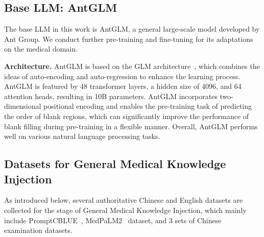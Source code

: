 \documentclass{article} %
\begin{document}
\subsection{Base LLM: AntGLM}
The base LLM in this work is AntGLM, a general large-scale model developed by Ant Group. We conduct further pre-training and fine-tuning for its adaptations on the medical domain.


\textbf{Architecture.} AntGLM is based on the GLM architecture~\citep{DBLP:conf/acl/DuQLDQY022}, which combines the ideas of auto-encoding and auto-regression to enhance the learning process. AntGLM is featured by 48 transformer layers, a hidden size of 4096, and 64 attention heads, resulting in 10B parameters. AntGLM incorporates two-dimensional positional encoding and enables the pre-training task of predicting the order of blank regions, which can significantly improve the performance of blank filling during pre-training in a flexible manner. Overall, AntGLM performs well on various natural language processing tasks.


\subsection{Datasets for General Medical Knowledge Injection}
As introduced below, several authoritative Chinese and English datasets are collected for the stage of General Medical Knowledge Injection, which mainly include PromptCBLUE~\citep{zhu2023promptcblue}, MedPaLM2~\citep{singhal2023expertlevel} dataset, and 3 sets of Chinese examination datasets.   


\end{document}

